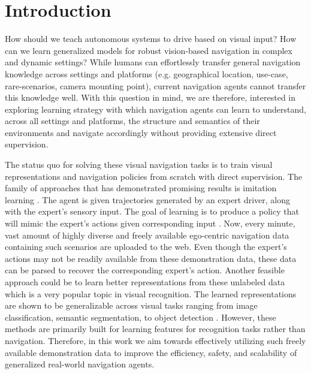 \documentclass[letterpaper, 12pt]{book}
\theoremstyle{definition}
\theoremstyle{definition}
\theoremstyle{definition}
\theoremstyle{definition}
\theoremstyle{definition}
\begin{document}
\clearpage 

\clearpage \tableofcontents \clearpage

\chapter{Introduction}
\label{sec:org171f14e}
How should we teach autonomous systems to drive based on visual input? How can
we learn generalized models for robust vision-based navigation in complex and
dynamic settings? While humans can effortlessly transfer general navigation
knowledge across settings and platforms (e.g. geographical location, use-case,
rare-scenarios, camera mounting point), current navigation agents cannot
transfer this knowledge well. With this question in mind, we are therefore,
interested in exploring learning strategy with which navigation agents can learn
to understand, across all settings and platforms, the structure and semantics of
their environments and navigate accordingly without providing extensive direct
supervision.

The status quo for solving these visual navigation tasks is to train visual
representations and navigation policies from scratch with direct supervision.
The family of approaches that has demonstrated promising results is imitation
learning \cite{Chen2019,Codevilla2017}. The agent is given trajectories
generated by an expert driver, along with the expert's sensory input. The goal
of learning is to produce a policy that will mimic the expert’s actions given
corresponding input
\cite{article,Bojarski2016,7410669,chen2021learning,Gupta2017,Hawke2019,Li2018,Liang2018,Mueller2018,inproceedings,Osa2018,Pomerleau1988,Prakash2021,Zhang2021}.
Now, every minute, vast amount of highly diverse and freely available
ego-centric navigation data containing such scenarios are uploaded to the
web. Even though the expert's actions may not be readily available from these
demonstration data, these data can be parsed to recover the corresponding
expert's action.  Another feasible approach could be to learn better
representations from these unlabeled data which is a very popular topic in
visual recognition. The learned representations are shown to be generalizable
across visual tasks ranging from image classification, semantic segmentation, to
object detection \cite{Chen2020a,Grill2020,He2019,Caron2020,Caron2021}. However,
these methods are primarily built for learning features for recognition tasks
rather than navigation. Therefore, in this work we aim towards effectively
utilizing such freely available demonstration data to improve the efficiency,
safety, and scalability of generalized real-world navigation agents.
\end{document}
